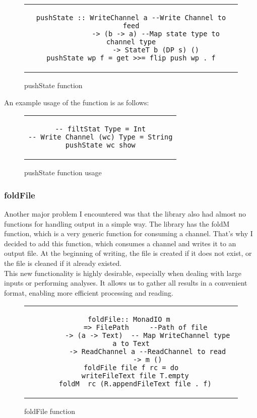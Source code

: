 \begin{figure}[H]
    \begin{tabular}{c}
        \begin{lstlisting}
pushState :: WriteChannel a --Write Channel to feed
            -> (b -> a) --Map state type to channel type
            -> StateT b (DP s) ()
pushState wp f = get >>= flip push wp . f
        \end{lstlisting}
    \end{tabular}
    \caption[{[Code]} pushState definition]{pushState function}
    \label{fig:HC23}
\end{figure}
An example usage of the function is as follows:

\begin{figure}[H]
    \begin{tabular}{c}
        \begin{lstlisting}
-- filtStat Type = Int
-- Write Channel (wc) Type = String
pushState wc show
        \end{lstlisting}
    \end{tabular}
    \caption[{[Code]} pushState example]{pushState function usage}
    \label{fig:HC23b}
\end{figure}

\subsubsection*{foldFile}
Another major problem I encountered was that the library also had almost no functions for handling output in a simple way.
The library has the foldM function, which is a very generic function for consuming a channel.
That's why I decided to add this function, which consumes a channel and writes it to an output file.
At the beginning of writing, the file is created if it does not exist, or the file is cleaned if it already existed. \\

This new functionality is highly desirable, especially when dealing with large inputs or performing analyses.
It allows us to gather all results in a convenient format, enabling more efficient processing and reading.

\begin{figure}[H]
    \begin{tabular}{c}
        \begin{lstlisting}
foldFile:: MonadIO m 
        => FilePath     --Path of file 
        -> (a -> Text)  -- Map WriteChannel type a to Text
        -> ReadChannel a --ReadChannel to read
        -> m ()
foldFile file f rc = do
  writeFileText file T.empty
  foldM_ rc (R.appendFileText file . f)
        \end{lstlisting}
    \end{tabular}
    \caption[{[Code]} foldFile definition]{foldFile function}
    \label{fig:HC24}
\end{figure}

